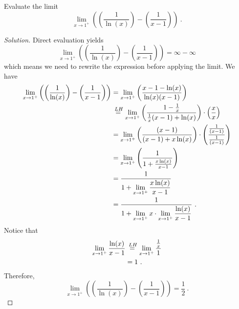 \documentclass[compacto,10pt,comentarios]{aleph-notas}
\newcommand*\Heq{\ensuremath{\overset{\kern2pt LH}{=}}}
\begin{document}
\begin{ejer}
    Evaluate the limit
    $$
        \lim_{x \to 1^{+}} \left( \left( \frac{1}{\ln(x)} \right) - \left( \frac{1}{x - 1} \right) \right) ~ .
    $$
\end{ejer}
\begin{proof}[Solution]
    Direct evaluation yields
    $$
    \lim_{x \to 1^{+}} \left( \left( \frac{1}{\ln(x)} \right) - \left( \frac{1}{x - 1} \right) \right)
    = \infty - \infty
    $$
    which means we need to rewrite the expression before applying the limit. We have
    \begin{align*}
        \lim_{x \to 1^{+}} \left( \left( \frac{1}{\ln(x)} \right) - \left( \frac{1}{x - 1} \right) \right) 
        & = \lim_{x \to 1^{+}} \left( \frac{x - 1 - \ln(x)}{\ln(x)(x - 1)} \right) \\
        & \Heq \lim_{x \to 1^{+}} \left( \frac{ 1 - \frac{1}{x}}{\frac{1}{x} (x - 1) + \ln(x)} \right) \cdot \left( \frac{x}{x} \right)\\
        & = \lim_{x \to 1^{+}} \left( \frac{(x - 1)}{(x - 1) + x \ln(x)} \right) \cdot \left( \frac{\frac{1}{(x-1)}}{\frac{1}{(x-1)}} \right)\\
        & = \lim_{x \to 1^{+}} \left( \frac{1}{1 + \frac{x \ln(x)}{x - 1}} \right) \\
        & = \frac{1}{1 + \displaystyle\lim_{x \to 1^{+}} \frac{x \ln(x)}{x - 1}} \\
        & = \frac{1}{1 + \displaystyle\lim_{x \to 1^{+}} x \cdot \displaystyle\lim_{x \to 1^{+}} \frac{\ln(x)}{x - 1}} ~ .
    \end{align*}
    Notice that
    \begin{align*}
        \lim_{x \to 1^{+}} \frac{\ln(x)}{x - 1}
        & \Heq \lim_{x \to 1^{+}} \frac{\frac{1}{x}}{1} \\ 
        & = 1 ~ .
    \end{align*}
    Therefore,
    $$
        \lim_{x \to 1^{+}} \left( \left( \frac{1}{\ln(x)} \right) - \left( \frac{1}{x - 1} \right) \right) = \frac{1}{2} ~ .
    $$
\end{proof}
\end{document}
